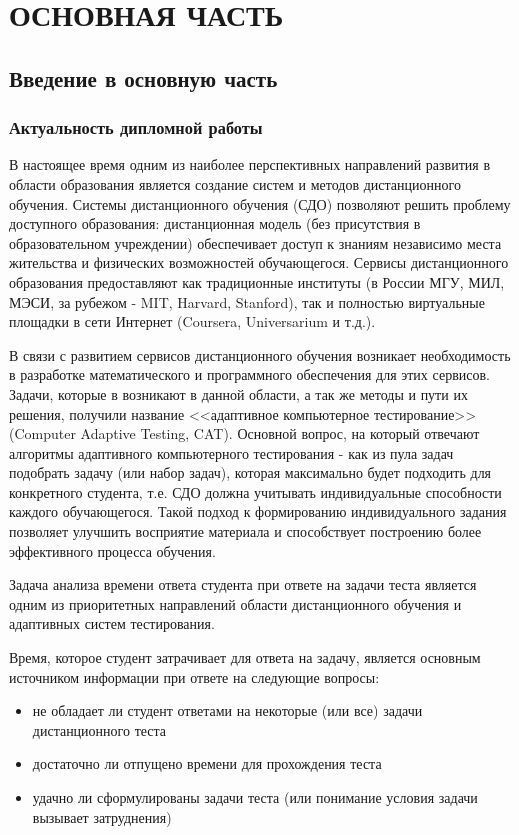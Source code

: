 {
\centering
\chapter{ОСНОВНАЯ ЧАСТЬ}
}
\setcounter{page}{4}
\newpage

\section{Введение в основную часть}
\label{intr}
\subsection{Актуальность дипломной работы}

В настоящее время одним из наиболее перспективных направлений раз\-вития в области образования является создание систем и методов дистанци\-онного обучения. Системы дистанционного обучения (СДО) позволяют ре\-шить проблему доступного образования: дистанционная модель (без присут\-ствия в образовательном учреждении) обеспечивает доступ к знаниям неза\-висимо места жительства и физических возможностей обучающегося. Сер\-висы дистанционного образования предоставляют как традиционные инсти\-туты (в России МГУ\cite{24.}, МИЛ\cite{25.}, МЭСИ\cite{26.}, за рубежом - MIT, Harvard, Stanford\cite{28.}), так и полностью виртуальные площадки в сети Интернет (Coursera\cite{27.}, Universarium\cite{29.} и т.д.).

В связи с развитием сервисов дистанционного обучения возникает необ\-ходимость в разработке математического и программного обеспечения для этих сервисов. Задачи, которые в возникают в данной области, а так же методы и пути их решения, получили название <<адаптивное компьютерное тестирование>> (Computer Adaptive Testing, CAT). Основной вопрос, на ко\-торый отвечают алгоритмы адаптивного компьютерного тестирования - как из пула задач подобрать задачу (или набор задач), которая максимально будет подходить для конкретного студента, т.е. СДО должна учитывать ин\-дивидуальные способности каждого обучающегося\cite{9.}. Такой подход к форми\-рованию индивидуального задания позволяет улучшить восприятие мате\-риала и способствует построению более эффективного процесса обучения.

Задача анализа времени ответа студента при ответе на задачи теста явля\-ется одним из приоритетных направлений области дистанционного обу\-чения и адаптивных систем тестирования. 

Время, которое студент затрачивает для ответа на задачу, является ос\-новным источником информации при ответе на следующие вопросы:
\begin{itemize}
\item не обладает ли студент ответами на некоторые (или все) задачи дистан\-ционного теста
\item достаточно ли отпущено времени для прохождения теста
\item удачно ли сформулированы задачи теста (или понимание условия за\-дачи вызывает затруднения)
\end{itemize}

